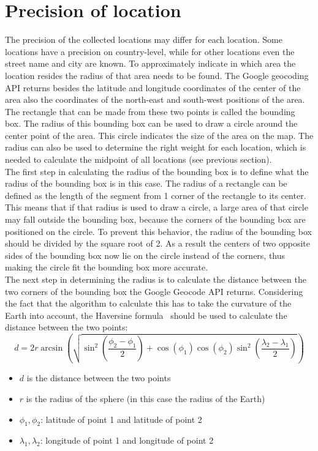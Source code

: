 \documentclass[twoside,openright,notitlepage]{uva-bachelor-thesis}
\begin{document}
\section{Precision of location}
The precision of the collected locations may differ for each location. Some locations have a precision on country-level, while for other locations even the street name and city are known. To approximately indicate in which area the location resides the radius of that area needs to be found. The Google geocoding API returns besides the latitude and longitude coordinates of the center of the area also the coordinates of the north-east and south-west positions of the area. The rectangle that can be made from these two points is called the bounding box. The radius of this bounding box can be used to draw a circle around the center point of the area. This circle indicates the size of the area on the map. The radius can also be used to determine the right weight for each location, which is needed to calculate the midpoint of all locations (see previous section).\\

The first step in calculating the radius of the bounding box is to define what the radius of the bounding box is in this case. The radius of a rectangle can be defined as the length of the segment from 1 corner of the rectangle to its center. This means that if that radius is used to draw a circle, a large area of that circle may fall outside the bounding box, because the corners of the bounding box are positioned on the circle. To prevent this behavior, the radius of the bounding box should be divided by the square root of 2. As a result the centers of two opposite sides of the bounding box now lie on the circle instead of the corners, thus making the circle fit the bounding box more accurate.\\

The next step in determining the radius is to calculate the distance between the two corners of the bounding box the Google Geocode API returns. Considering the fact that the algorithm to calculate this has to take the curvature of the Earth into account, the Haversine formula~\cite{mts} should be used to calculate the distance between the two points:\\

$$d = 2r \arcsin\left(\sqrt{\sin^2\left(\frac{\phi_2 - \phi_1}{2}\right) + \cos(\phi_1) \cos(\phi_2)\sin^2\left(\frac{\lambda_2 - \lambda_1}{2}\right)}\right)$$

\begin{itemize}
\item $d$ is the distance between the two points
\item $r$ is the radius of the sphere (in this case the radius of the Earth)
\item $\phi_1, \phi_2$: latitude of point 1  and latitude of point 2
\item $\lambda_1, \lambda_2$: longitude of point 1 and longitude of point 2
\end{itemize}
\end{document}

